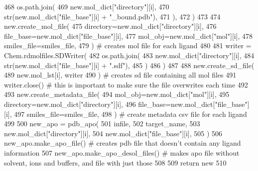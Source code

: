 \begin{DoxyCode}
468             os.path.join(
469                 new.mol\_dict[\textcolor{stringliteral}{"directory"}][i],
470                 str(new.mol\_dict[\textcolor{stringliteral}{"file\_base"}][i] + \textcolor{stringliteral}{"\_bound.pdb"}),
471             ),
472         )
473 
474         new.create\_mol\_file(
475             directory=new.mol\_dict[\textcolor{stringliteral}{"directory"}][i],
476             file\_base=new.mol\_dict[\textcolor{stringliteral}{"file\_base"}][i],
477             mol\_obj=new.mol\_dict[\textcolor{stringliteral}{"mol"}][i],
478             smiles\_file=smiles\_file,
479         )  \textcolor{comment}{# creates mol file for each ligand}
480 
481         writer = Chem.rdmolfiles.SDWriter(
482             os.path.join(
483                 new.mol\_dict[\textcolor{stringliteral}{"directory"}][i],
484                 str(new.mol\_dict[\textcolor{stringliteral}{"file\_base"}][i] + \textcolor{stringliteral}{".sdf"}),
485             )
486         )
487 
488         new.create\_sd\_file(
489             new.mol\_lst[i], writer
490         )  \textcolor{comment}{# creates sd file containing all mol files}
491         writer.close()  \textcolor{comment}{# this is important to make sure the file overwrites each time}
492 
493         new.create\_metadata\_file(
494             mol\_obj=new.mol\_dict[\textcolor{stringliteral}{"mol"}][i],
495             directory=new.mol\_dict[\textcolor{stringliteral}{"directory"}][i],
496             file\_base=new.mol\_dict[\textcolor{stringliteral}{"file\_base"}][i],
497             smiles\_file=smiles\_file,
498         )  \textcolor{comment}{# create metadata csv file for each ligand}
499 
500         new\_apo = pdb\_apo(
501             infile,
502             target\_name,
503             new.mol\_dict[\textcolor{stringliteral}{"directory"}][i],
504             new.mol\_dict[\textcolor{stringliteral}{"file\_base"}][i],
505         )
506         new\_apo.make\_apo\_file()  \textcolor{comment}{# creates pdb file that doesn't contain any ligand information}
507         new\_apo.make\_apo\_desol\_files()  \textcolor{comment}{# makes apo file without solvent, ions and buffers, and file with
       just those}
508 
509     \textcolor{keywordflow}{return} new
510 \end{DoxyCode}
